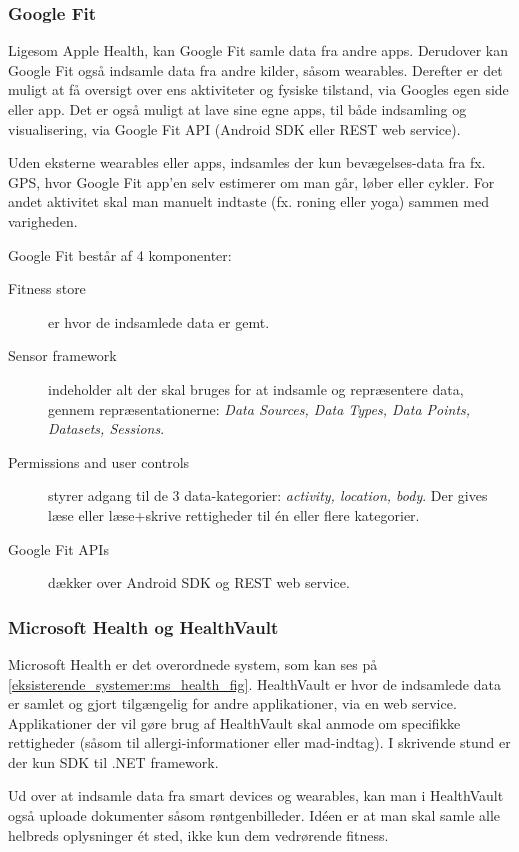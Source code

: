 \subsubsection{Google Fit}
Ligesom Apple Health, kan Google Fit samle data fra andre apps.
Derudover kan Google Fit også indsamle data fra andre kilder, såsom wearables.
Derefter er det muligt at få oversigt over ens aktiviteter og fysiske tilstand, via Googles egen side eller app.
Det er også muligt at lave sine egne apps, til både indsamling og visualisering, via Google Fit API (Android SDK eller REST web service).

Uden eksterne wearables eller apps, indsamles der kun bevægelses-data fra fx. GPS, hvor Google Fit app'en selv estimerer om man går, løber eller cykler.
For andet aktivitet skal man manuelt indtaste (fx. roning eller yoga) sammen med varigheden.

Google Fit består af 4 komponenter:

\begin{description}
\item[Fitness store] er hvor de indsamlede data er gemt.
\item[Sensor framework] indeholder alt der skal bruges for at indsamle og repræsentere data, gennem repræsentationerne: \textit{Data Sources, Data Types, Data Points, Datasets, Sessions}.
\item[Permissions and user controls] styrer adgang til de 3 data-kategorier: \textit{activity, location, body}.
Der gives læse eller læse+skrive rettigheder til én eller flere kategorier.
\item[Google Fit APIs] dækker over Android SDK og REST web service.
\end{description}

\subsubsection{Microsoft Health og HealthVault}
Microsoft Health er det overordnede system, som kan ses på \cref{eksisterende_systemer:ms_health_fig}.
HealthVault er hvor de indsamlede data er samlet og gjort tilgængelig for andre applikationer, via en web service.
Applikationer der vil gøre brug af HealthVault skal anmode om specifikke rettigheder (såsom til allergi-informationer eller mad-indtag).
I skrivende stund er der kun SDK til .NET framework.

Ud over at indsamle data fra smart devices og wearables, kan man i HealthVault også uploade dokumenter såsom røntgenbilleder.
Idéen er at man skal samle alle helbreds oplysninger ét sted, ikke kun dem vedrørende fitness.

